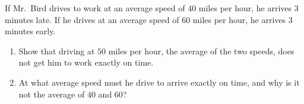 If Mr.\ Bird drives to work at an average speed of $40$ miles per hour, he arrives $3$ minutes late. If he drives at an average speed of $60$ miles per hour, he arrives $3$ minutes early.
\begin{enumerate}
\item[(a)] Show that driving at $50$ miles per hour, the average of the two speeds, does not get him to work exactly on time.
\item[(b)] At what average speed must he drive to arrive exactly on time, and why is it not the average of $40$ and $60$?
\end{enumerate}
